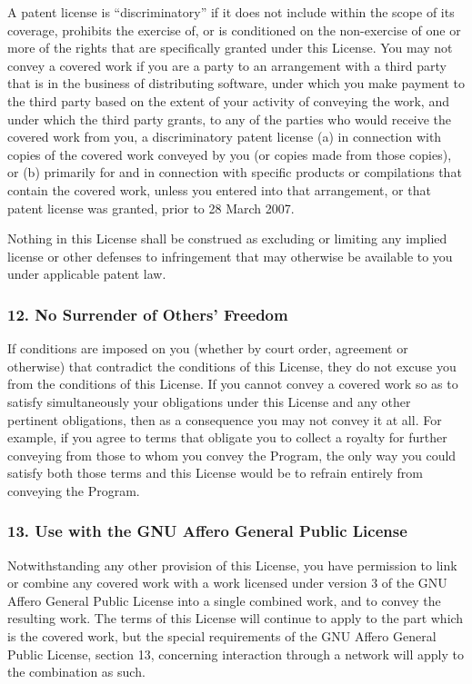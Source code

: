 \documentclass[a4paper, 11pt, twoside]{article}
\begin{document}
A patent license is “discriminatory” if it does not include within the scope of its coverage, prohibits the exercise of, or is conditioned on the non-exercise of one or more of the rights that are specifically granted under this License. You may not convey a covered work if you are a party to an arrangement with a third party that is in the business of distributing software, under which you make payment to the third party based on the extent of your activity of conveying the work, and under which the third party grants, to any of the parties who would receive the covered work from you, a discriminatory patent license (a) in connection with copies of the covered work conveyed by you (or copies made from those copies), or (b) primarily for and in connection with specific products or compilations that contain the covered work, unless you entered into that arrangement, or that patent license was granted, prior to 28 March 2007.

Nothing in this License shall be construed as excluding or limiting any implied license or other defenses to infringement that may otherwise be available to you under applicable patent law.

\subsubsection{12. No Surrender of Others' Freedom}

If conditions are imposed on you (whether by court order, agreement or otherwise) that contradict the conditions of this License, they do not excuse you from the conditions of this License. If you cannot convey a covered work so as to satisfy simultaneously your obligations under this License and any other pertinent obligations, then as a consequence you may not convey it at all. For example, if you agree to terms that obligate you to collect a royalty for further conveying from those to whom you convey the Program, the only way you could satisfy both those terms and this License would be to refrain entirely from conveying the Program.

\subsubsection{13. Use with the GNU Affero General Public License}

Notwithstanding any other provision of this License, you have permission to link or combine any covered work with a work licensed under version 3 of the GNU Affero General Public License into a single combined work, and to convey the resulting work. The terms of this License will continue to apply to the part which is the covered work, but the special requirements of the GNU Affero General Public License, section 13, concerning interaction through a network will apply to the combination as such.
\end{document}

